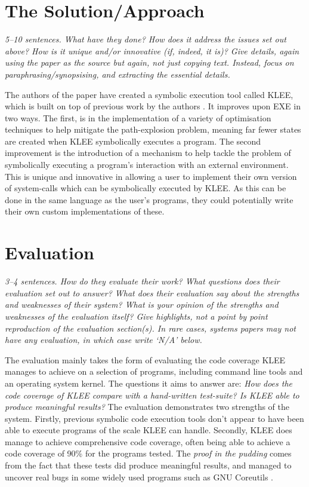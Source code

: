 \documentclass[11pt]{article}
\begin{document}
\section*{The Solution/Approach}

\textsl{5--10 sentences. What have they done? How does it address the issues
set out above? How is it unique and/or innovative (if, indeed, it is)? Give
details, again using the paper as the source but again, not just copying text.
Instead, focus on paraphrasing/synopsising, and extracting the essential
details.}

The authors of the paper have created a symbolic execution tool called KLEE,
which is built on top of previous work by the authors \cite{EXE}. It improves
upon EXE in two ways. The first, is in the implementation of a variety of
optimisation techniques to help mitigate the path-explosion problem, meaning
far fewer states are created when KLEE symbolically executes a program. The
second improvement is the introduction of a mechanism to help tackle the
problem of symbolically executing a program's interaction with an external
environment. This is unique and innovative in allowing a user to implement
their own version of system-calls which can be symbolically executed by KLEE.
As this can be done in the same language as the user's programs, they could
potentially write their own custom implementations of these.

\section*{Evaluation}

\textsl{3--4 sentences. How do they evaluate their work? What questions does
their evaluation set out to answer? What does their evaluation say about the
strengths and weaknesses of their system? What is your opinion of the strengths
and weaknesses of the evaluation itself? Give highlights, not a point by point
reproduction of the evaluation section(s). In rare cases, systems papers may
not have any evaluation, in which case write `N/A' below.}

The evaluation mainly takes the form of evaluating the code coverage KLEE
manages to achieve on a selection of programs, including command line tools and
an operating system kernel. The questions it aims to answer are: \textit{How
does the code coverage of KLEE compare with a hand-written test-suite? Is KLEE
able to produce meaningful results?} The evaluation demonstrates two strengths
of the system. Firstly, previous symbolic code execution tools don't appear to
have been able to execute programs of the scale KLEE can handle. Secondly, KLEE
does manage to achieve comprehensive code coverage, often being able to achieve
a code coverage of 90\% for the programs tested. The \textit{proof in the
pudding} comes from the fact that these tests did produce meaningful results,
and managed to uncover real bugs in some widely used programs such as GNU
Coreutils \cite{Coreutils}.
\end{document}
